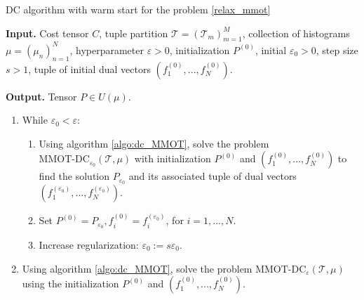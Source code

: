 \documentclass{article}
\begin{document}
\begin{algorithm}[H]
  \caption{DC algorithm with warm start for the problem \ref{relax_mmot}}
  \textbf{Input.} Cost tensor $C$, tuple partition $\mathcal T = (\mathcal T_m)_{m=1}^M$, collection of histograms $\mu = (\mu_n)_{n=1}^N$, 
  hyperparameter $\varepsilon > 0$, initialization $P^{(0)}$, initial $\varepsilon_0 > 0$, step size $s > 1$, 
  tuple of initial dual vectors $(f_1^{(0)}, ..., f_N^{(0)})$.

  \textbf{Output.} Tensor $P \in U(\mu)$.
  \begin{enumerate}
    \item While $\varepsilon_0 < \varepsilon$:
    \begin{enumerate}
      \item Using algorithm \ref{algo:dc_MMOT}, solve the problem $\text{MMOT-DC}_{\varepsilon_0}(\mathcal T, \mu)$ with initialization $P^{(0)}$ and 
      $(f_1^{(0)}, ..., f_N^{(0)})$ to find the solution $P_{\varepsilon_0}$ and its associated tuple of dual vectors 
      $(f_1^{(\varepsilon_0)}, ..., f_N^{(\varepsilon_0)})$.
      \item Set $P^{(0)} = P_{\varepsilon_0}, f_i^{(0)} = f_i^{(\varepsilon_0)}$, for $i=1,...,N$.
      \item Increase regularization: $\varepsilon_0 := s \varepsilon_0$.
    \end{enumerate}
    
    \item Using algorithm \ref{algo:dc_MMOT}, solve the problem $\text{MMOT-DC}_{\varepsilon}(\mathcal T, \mu)$ 
    using the initialization $P^{(0)}$ and $(f_1^{(0)},..., f_N^{(0)})$.
  \end{enumerate}
  \label{algo:acc_dc_MMOT}
\end{algorithm}

    
\end{document}
